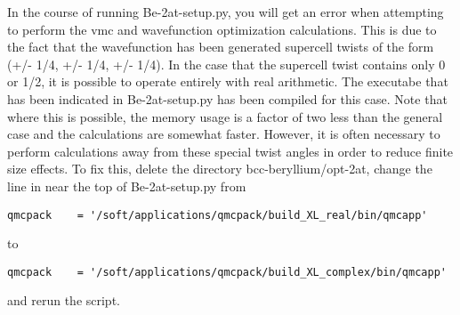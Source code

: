 In the course of running Be-2at-setup.py, you will get an error when attempting to perform the vmc and wavefunction optimization calculations.  This is due to the fact that the wavefunction has been generated supercell twists of the form (+/- 1/4, +/- 1/4, +/- 1/4).  In the case that the supercell twist contains only 0 or 1/2, it is possible to operate entirely with real arithmetic.  The executabe that has been indicated in Be-2at-setup.py has been compiled for this case.  Note that where this is possible, the memory usage is a factor of two less than the general case and the calculations are somewhat faster.  However, it is often necessary to perform calculations away from these special twist angles in order to reduce finite size effects.  To fix this, delete the directory bcc-beryllium/opt-2at, change the line in near the top of Be-2at-setup.py from 
\begin{lstlisting}
qmcpack    = '/soft/applications/qmcpack/build_XL_real/bin/qmcapp'
\end{lstlisting}
to
\begin{lstlisting}
qmcpack    = '/soft/applications/qmcpack/build_XL_complex/bin/qmcapp'
\end{lstlisting}
and rerun the script.


